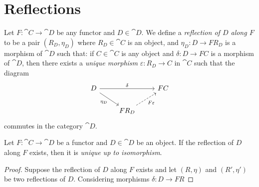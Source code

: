 \section{Reflections}

\begin{definition}
\label{def:reflection-functor}
Let \(F: \cat C \to \cat D\) be any functor and \(D \in \cat D\). We define a
\emph{reflection of \(D\) along \(F\)} to be a pair \((R_D, \eta_D)\) where
\(R_D \in \cat C\) is an object, and \(\eta_D: D \to F R_D\) is a morphism of
\(\cat D\) such that: if \(C \in \cat C\) is any object and
\(\delta: D \to F C\) is a morphism of \(\cat D\), then there exists a
\emph{unique morphism} \(\varepsilon: R_D \to C\) in \(\cat C\) such that the
diagram
\[
\begin{tikzcd}
D \ar[rd, "\eta_D"'] \ar[rr, "\delta"] & &F C \\
&F R_D \ar[ru, dashed, "F \varepsilon"'] &
\end{tikzcd}
\]
commutes in the category \(\cat D\).
\end{definition}

\begin{proposition}
\label{prop:reflection-unique-up-to-iso}
Let \(F: \cat C \to \cat D\) be a functor and \(D \in \cat D\) be an object. If
the reflection of \(D\) along \(F\) exists, then it is \emph{unique up to
  isomorphism}.
\end{proposition}

\begin{proof}
Suppose the reflection of \(D\) along \(F\) exists and let \((R, \eta)\) and
\((R', \eta')\) be two reflections of \(D\). Considering morphisms \(\delta: D
\to F R\)
\end{proof}

